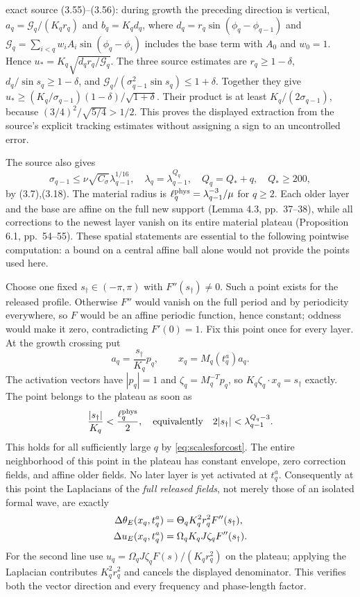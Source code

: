 exact source (3.55)--(3.56): during growth the preceding direction
is vertical, $a_q=\mathcal G_q/(K_qr_q)$ and $b_q=K_qd_q$,
where $d_q=r_q\sin(\phi_q-\phi_{q-1})$ and
$\mathcal G_q=\sum_{i<q}w_iA_i\sin(\phi_q-\phi_i)$ includes
the base term with $A_0$ and $w_0=1$. Hence
$u_*=K_q\sqrt{d_qr_q/\mathcal G_q}$. The three source estimates
are $r_q\geq1-\delta$, $d_q/\sin s_q\geq1-\delta$, and
$\mathcal G_q/(\sigma_{q-1}^2\sin s_q)\leq1+\delta$.
Together they give
$u_*\geq(K_q/\sigma_{q-1})(1-\delta)/\sqrt{1+\delta}$.
Their product is at least $K_q/(2\sigma_{q-1})$, because
$(3/4)^2/\sqrt{5/4}>1/2$. This proves the displayed extraction
from the source's explicit tracking estimates without assigning
a sign to an uncontrolled error.

The source also gives
\begin{equation}
 \sigma_{q-1}\leq\nu\sqrt{C_\sigma}\lambda_{q-1}^{1/16},
 \quad \lambda_q=\lambda_{q-1}^{Q_q},\quad Q_q=Q_*+q,
 \quad Q_*\geq200,
 \label{eq:scalesforcost}
\end{equation}
by (3.7),(3.18). The material radius is
$\ell_q^{\rm phys}=\lambda_{q-1}^{-3}/\mu$ for $q\geq2$.
Each older layer and the base are affine on the full new support
(Lemma 4.3, pp.~37--38), while all corrections to the newest
layer vanish on its entire material plateau (Proposition 6.1,
pp.~54--55). These spatial statements are essential to the following
pointwise computation: a bound on a central affine ball alone
would not provide the points used here.

Choose one fixed $s_\dagger\in(-\pi,\pi)$ with
$F''(s_\dagger)\ne0$. Such a point exists for the released
profile. Otherwise $F''$ would vanish on the full period and by
periodicity everywhere, so $F$ would be an affine periodic
function, hence constant; oddness would make it zero, contradicting
$F'(0)=1$. Fix this point once for every layer. At the growth
crossing put
\begin{equation}
 a_q=\frac{s_\dagger}{K_q}p_q,\qquad
 x_q=M_q(t_q^a)a_q.
 \label{eq:testpoint}
\end{equation}
The activation vectors have $|p_q|=1$ and
$\zeta_q=M_q^{-T}p_q$, so
$K_q\zeta_q\cdot x_q=s_\dagger$ exactly. The point belongs
to the plateau as soon as
\[
 \frac{|s_\dagger|}{K_q}<\frac{\ell_q^{\rm phys}}2,
 \quad\hbox{equivalently}\quad
 2|s_\dagger|<\lambda_{q-1}^{Q_q-3}.
\]
This holds for all sufficiently large $q$ by
\eqref{eq:scalesforcost}. The entire neighborhood of this point
in the plateau has constant envelope, zero correction fields,
and affine older fields. No later layer is yet activated at
$t_q^a$. Consequently at this point the Laplacians of the
\emph{full released fields}, not merely those of an isolated
formal wave, are exactly
\begin{align}
 \Delta\theta_E(x_q,t_q^a)
 &=\Theta_q K_q^2r_q^2F''(s_\dagger),\notag\\
 \Delta u_E(x_q,t_q^a)
 &=\Omega_qK_qJ\zeta_q F''(s_\dagger).
 \label{eq:fulllaplacians}
\end{align}
For the second line use
$u_q=\Omega_q J\zeta_qF(s)/(K_qr_q^2)$ on the plateau;
applying the Laplacian contributes $K_q^2r_q^2$ and cancels
the displayed denominator. This verifies both the vector
direction and every frequency and phase-length factor.

